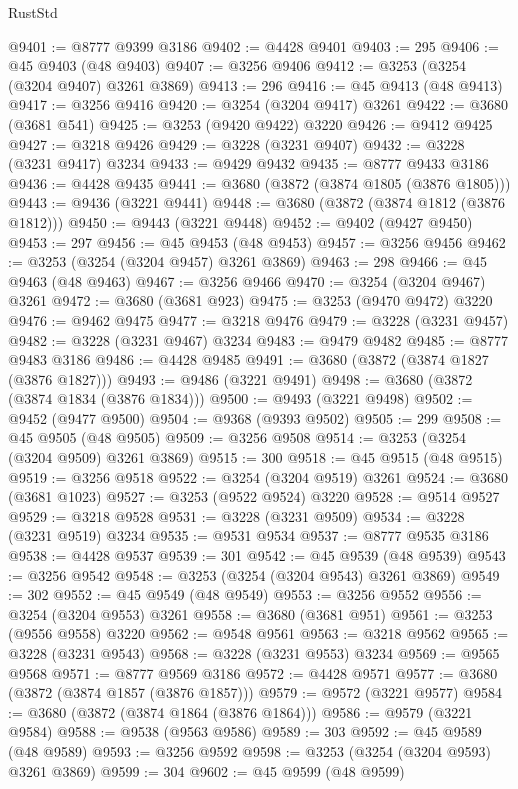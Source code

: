 \begin{lexlean}{RustStd}
\begin{coremodule}
@9401 := @8777 @9399 @3186
@9402 := @4428 @9401
@9403 := 295
@9406 := @45 @9403 (@48 @9403)
@9407 := @3256 @9406
@9412 := @3253 (@3254 (@3204 @9407) @3261 @3869)
@9413 := 296
@9416 := @45 @9413 (@48 @9413)
@9417 := @3256 @9416
@9420 := @3254 (@3204 @9417) @3261
@9422 := @3680 (@3681 @541)
@9425 := @3253 (@9420 @9422) @3220
@9426 := @9412 @9425
@9427 := @3218 @9426
@9429 := @3228 (@3231 @9407)
@9432 := @3228 (@3231 @9417) @3234
@9433 := @9429 @9432
@9435 := @8777 @9433 @3186
@9436 := @4428 @9435
@9441 := @3680 (@3872 (@3874 @1805 (@3876 @1805)))
@9443 := @9436 (@3221 @9441)
@9448 := @3680 (@3872 (@3874 @1812 (@3876 @1812)))
@9450 := @9443 (@3221 @9448)
@9452 := @9402 (@9427 @9450)
@9453 := 297
@9456 := @45 @9453 (@48 @9453)
@9457 := @3256 @9456
@9462 := @3253 (@3254 (@3204 @9457) @3261 @3869)
@9463 := 298
@9466 := @45 @9463 (@48 @9463)
@9467 := @3256 @9466
@9470 := @3254 (@3204 @9467) @3261
@9472 := @3680 (@3681 @923)
@9475 := @3253 (@9470 @9472) @3220
@9476 := @9462 @9475
@9477 := @3218 @9476
@9479 := @3228 (@3231 @9457)
@9482 := @3228 (@3231 @9467) @3234
@9483 := @9479 @9482
@9485 := @8777 @9483 @3186
@9486 := @4428 @9485
@9491 := @3680 (@3872 (@3874 @1827 (@3876 @1827)))
@9493 := @9486 (@3221 @9491)
@9498 := @3680 (@3872 (@3874 @1834 (@3876 @1834)))
@9500 := @9493 (@3221 @9498)
@9502 := @9452 (@9477 @9500)
@9504 := @9368 (@9393 @9502)
@9505 := 299
@9508 := @45 @9505 (@48 @9505)
@9509 := @3256 @9508
@9514 := @3253 (@3254 (@3204 @9509) @3261 @3869)
@9515 := 300
@9518 := @45 @9515 (@48 @9515)
@9519 := @3256 @9518
@9522 := @3254 (@3204 @9519) @3261
@9524 := @3680 (@3681 @1023)
@9527 := @3253 (@9522 @9524) @3220
@9528 := @9514 @9527
@9529 := @3218 @9528
@9531 := @3228 (@3231 @9509)
@9534 := @3228 (@3231 @9519) @3234
@9535 := @9531 @9534
@9537 := @8777 @9535 @3186
@9538 := @4428 @9537
@9539 := 301
@9542 := @45 @9539 (@48 @9539)
@9543 := @3256 @9542
@9548 := @3253 (@3254 (@3204 @9543) @3261 @3869)
@9549 := 302
@9552 := @45 @9549 (@48 @9549)
@9553 := @3256 @9552
@9556 := @3254 (@3204 @9553) @3261
@9558 := @3680 (@3681 @951)
@9561 := @3253 (@9556 @9558) @3220
@9562 := @9548 @9561
@9563 := @3218 @9562
@9565 := @3228 (@3231 @9543)
@9568 := @3228 (@3231 @9553) @3234
@9569 := @9565 @9568
@9571 := @8777 @9569 @3186
@9572 := @4428 @9571
@9577 := @3680 (@3872 (@3874 @1857 (@3876 @1857)))
@9579 := @9572 (@3221 @9577)
@9584 := @3680 (@3872 (@3874 @1864 (@3876 @1864)))
@9586 := @9579 (@3221 @9584)
@9588 := @9538 (@9563 @9586)
@9589 := 303
@9592 := @45 @9589 (@48 @9589)
@9593 := @3256 @9592
@9598 := @3253 (@3254 (@3204 @9593) @3261 @3869)
@9599 := 304
@9602 := @45 @9599 (@48 @9599)

\end{coremodule}
\end{lexlean}
